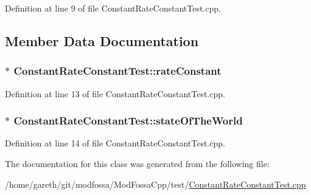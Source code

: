 Definition at line 9 of file ConstantRateConstantTest.cpp.



\subsection{Member Data Documentation}
\hypertarget{classConstantRateConstantTest_a3c05de2c151ba6f66f7bb4263a737b0e}{
\subsubsection[{rateConstant}]{$\ast$ {\bf ConstantRateConstantTest::rateConstant}}}
\label{classConstantRateConstantTest_a3c05de2c151ba6f66f7bb4263a737b0e}


Definition at line 13 of file ConstantRateConstantTest.cpp.

\hypertarget{classConstantRateConstantTest_a33885d8292d148c391de69acf60a882d}{
\subsubsection[{stateOfTheWorld}]{$\ast$ {\bf ConstantRateConstantTest::stateOfTheWorld}}}
\label{classConstantRateConstantTest_a33885d8292d148c391de69acf60a882d}


Definition at line 14 of file ConstantRateConstantTest.cpp.



The documentation for this class was generated from the following file:\begin{DoxyCompactItemize}
\item 
/home/gareth/git/modfossa/ModFossaCpp/test/\hyperlink{ConstantRateConstantTest_8cpp}{ConstantRateConstantTest.cpp}\end{DoxyCompactItemize}
